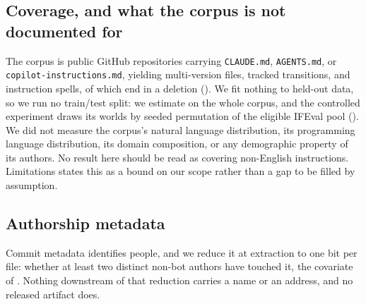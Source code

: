 \subsection{Coverage, and what the corpus is not documented for}
\label{sec:appendix:coverage}

The corpus is
\FieldRepos{} public GitHub repositories carrying \texttt{CLAUDE.md},
\texttt{AGENTS.md}, or \texttt{copilot-instructions.md}, yielding
\FieldMultiVersionFiles{} multi-version files, \FieldMatches{} tracked
transitions, and \FieldSpells{} instruction spells, of which
\FieldDeletions{} end in a deletion (). We fit
nothing to held-out data, so we run no train/test split: we estimate on the
whole corpus, and the controlled experiment draws its worlds by seeded
permutation of the eligible IFEval pool (). We did
not measure the corpus's natural language distribution, its programming
language distribution, its domain composition, or any demographic property of
its authors. No result here should be read as covering non-English
instructions. Limitations states this as a bound on our scope rather than a gap
to be filled by assumption.

\subsection{Authorship metadata}
\label{sec:appendix:authorship}

Commit metadata identifies people, and we
reduce it at extraction to one bit per file: whether at least two distinct
non-bot authors have touched it, the covariate of
. Nothing downstream of that reduction
carries a name or an address, and no released artifact does.
